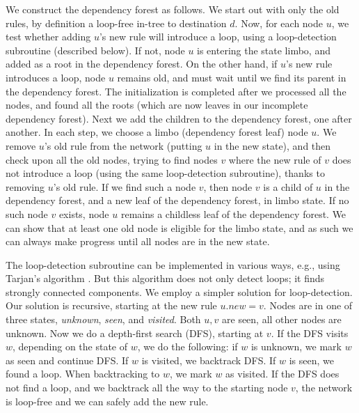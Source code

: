 We construct the dependency forest as follows. We start out with only the old rules, by definition a loop-free in-tree to destination $d$. Now, for each node $u$, we test whether adding $u$'s new rule will introduce a loop, using a loop-detection subroutine (described below). If not, node $u$ is entering the state limbo, and added as a root in the dependency forest. On the other hand, if $u$'s new rule introduces a loop, node $u$ remains old, and must wait until we find its parent in the dependency forest. The initialization is completed after we processed all the nodes, and found all the roots (which are now leaves in our incomplete dependency forest). Next we add the children to the dependency forest, one after another. In each step, we choose a limbo (dependency forest leaf) node $u$. We remove $u$'s old rule from the network (putting $u$ in the new state), and then check upon all the old nodes, trying to find nodes $v$ where the new rule of $v$ does not introduce a loop (using the same loop-detection subroutine), thanks to removing $u$'s old rule. If we find such a node $v$, then node $v$ is a child of $u$ in the dependency forest, and a new leaf of the dependency forest, in limbo state. If no such node $v$ exists, node $u$ remains a childless leaf of the dependency forest. We can show that at least one old node is eligible for the limbo state,
and as such we can always make progress until all nodes are in the new state.


The loop-detection subroutine can be implemented in various ways, e.g., using
Tarjan's algorithm \cite{tarjan72}. But this algorithm does not only detect loops; it finds strongly connected components. We employ a simpler solution for loop-detection. Our solution is recursive, starting at the new rule $u.new = v$. Nodes are in one of three states, \emph{unknown}, \emph{seen}, and \emph{visited}. Both $u,v$ are seen, all other nodes are unknown. Now we do a depth-first search (DFS), starting at $v$. If the DFS visits $w$, depending on the state of $w$, we do the following: if $w$ is unknown, we mark $w$ as seen and continue DFS. If $w$ is visited, we backtrack DFS. If $w$ is seen, we found a loop. When backtracking to $w$, we mark $w$ as visited. If the DFS does not find a loop, and we backtrack all the way to the starting node $v$, the network is loop-free and we can safely add the new rule.



